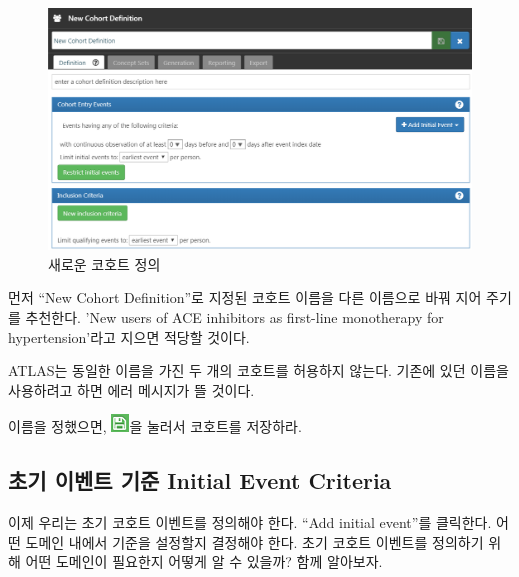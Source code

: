 \documentclass[10.5pt]{book}
\theoremstyle{definition}
\theoremstyle{definition}
\theoremstyle{definition}
\theoremstyle{remark}
\let\BeginKnitrBlock\begin \let\EndKnitrBlock\end
\begin{document}
\begin{figure}

{\centering \includegraphics[width=1\linewidth]{images/Cohorts/ATLAS-defineacohort} 

}

\caption{새로운 코호트 정의}\label{fig:ATLASdefineacohort}
\end{figure}

먼저 ``New Cohort Definition''로 지정된 코호트 이름을 다른 이름으로 바꿔
지어 주기를 추천한다. 'New users of ACE inhibitors as first-line
monotherapy for hypertension'라고 지으면 적당할 것이다.

\BeginKnitrBlock{rmdimportant}
ATLAS는 동일한 이름을 가진 두 개의 코호트를 허용하지 않는다. 기존에 있던
이름을 사용하려고 하면 에러 메시지가 뜰 것이다.
\EndKnitrBlock{rmdimportant}

이름을 정했으면, \includegraphics{images/Cohorts/save.png}을 눌러서
코호트를 저장하라.

\subsection{초기 이벤트 기준 Initial Event
Criteria}\label{---initial-event-criteria}

이제 우리는 초기 코호트 이벤트를 정의해야 한다. ``Add initial event''를
클릭한다. 어떤 도메인 내에서 기준을 설정할지 결정해야 한다. 초기 코호트
이벤트를 정의하기 위해 어떤 도메인이 필요한지 어떻게 알 수 있을까? 함께
알아보자.
\end{document}
